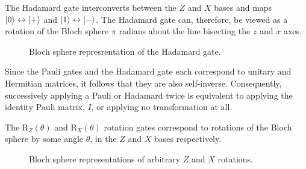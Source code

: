 
The Hadamard gate interconverts between the $Z$ and $X$ bases and maps $\ket 0 \leftrightarrow \ket +$ and $\ket 1 \leftrightarrow \ket -$. The Hadamard gate can, therefore, be viewed as a rotation of the Bloch sphere $\pi$ radians about the line bisecting the $z$ and $x$ axes.

\begin{figure}[H]
    \centering
    \caption{Bloch sphere represrentation of the Hadamard gate.}
\end{figure}

Since the Pauli gates and the Hadamard gate each correspond to unitary and Hermitian matrices, it follows that they are also self-inverse. Consequently, successively applying a Pauli or Hadamard twice is equivalent to applying the identity Pauli matrix, $I$, or applying no transformation at all.

The R$_Z(\theta)$ and R$_X(\theta)$ rotation gates correspond to rotations of the Bloch sphere by some angle $\theta$, in the $Z$ and $X$ bases respectively.

\begin{figure}[H]
    \centering
    \begin{minipage}{0.45\textwidth}
        \centering
    \end{minipage}
    \begin{minipage}{0.45\textwidth}
        \centering
    \end{minipage}
    \caption{Bloch sphere representations of arbitrary $Z$ and $X$ rotations.}
\end{figure}

